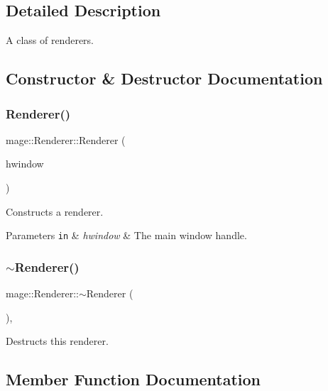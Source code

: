 \subsection{Detailed Description}
A class of renderers. 

\subsection{Constructor \& Destructor Documentation}
\hypertarget{classmage_1_1_renderer_a762dcda433c319af237d1dfd9bc6095f}{}\label{classmage_1_1_renderer_a762dcda433c319af237d1dfd9bc6095f} 
\subsubsection{\texorpdfstring{Renderer()}{Renderer()}}
{\footnotesize\ttfamily mage\+::\+Renderer\+::\+Renderer (\begin{DoxyParamCaption}\item[{H\+W\+ND}]{hwindow }\end{DoxyParamCaption})\hspace{0.3cm}{\ttfamily [protected]}}

Constructs a renderer.


\begin{DoxyParams}[1]{Parameters}
\mbox{\tt in}  & {\em hwindow} & The main window handle. \\
\hline
\end{DoxyParams}
\hypertarget{classmage_1_1_renderer_a997e041f28cc71d069d1ab7d29fe6ced}{}\label{classmage_1_1_renderer_a997e041f28cc71d069d1ab7d29fe6ced} 
\subsubsection{\texorpdfstring{$\sim$\+Renderer()}{~Renderer()}}
{\footnotesize\ttfamily mage\+::\+Renderer\+::$\sim$\+Renderer (\begin{DoxyParamCaption}{ }\end{DoxyParamCaption})\hspace{0.3cm}{\ttfamily [protected]}, {\ttfamily [virtual]}}

Destructs this renderer. 

\subsection{Member Function Documentation}
\hypertarget{classmage_1_1_renderer_a176e6ae84ec4490f72c32a352f768c9b}{}\label{classmage_1_1_renderer_a176e6ae84ec4490f72c32a352f768c9b} 
